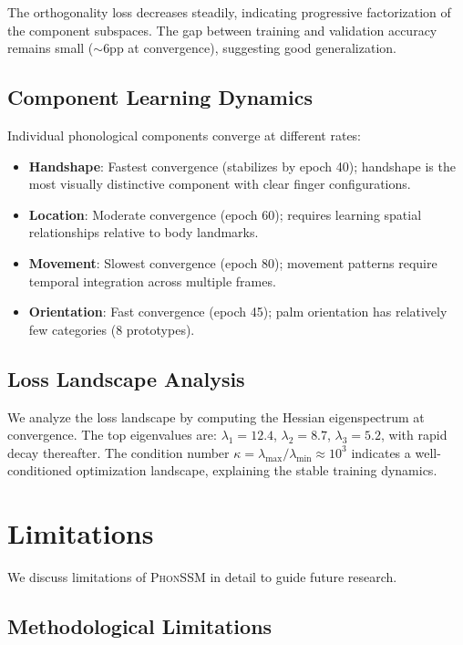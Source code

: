 \documentclass[sigconf,nonacm,anonymous]{acmart}
\theoremstyle{definition}
\theoremstyle{remark}
\newcommand{\phonssm}{\textsc{PhonSSM}}
\begin{document}
The orthogonality loss decreases steadily, indicating progressive factorization of the component subspaces. The gap between training and validation accuracy remains small ($\sim$6pp at convergence), suggesting good generalization.

\subsection{Component Learning Dynamics}

Individual phonological components converge at different rates:

\begin{itemize}[nosep,topsep=3pt,leftmargin=*]
\item \textbf{Handshape}: Fastest convergence (stabilizes by epoch 40); handshape is the most visually distinctive component with clear finger configurations.
\item \textbf{Location}: Moderate convergence (epoch 60); requires learning spatial relationships relative to body landmarks.
\item \textbf{Movement}: Slowest convergence (epoch 80); movement patterns require temporal integration across multiple frames.
\item \textbf{Orientation}: Fast convergence (epoch 45); palm orientation has relatively few categories (8 prototypes).
\end{itemize}

\subsection{Loss Landscape Analysis}

We analyze the loss landscape by computing the Hessian eigenspectrum at convergence. The top eigenvalues are: $\lambda_1 = 12.4$, $\lambda_2 = 8.7$, $\lambda_3 = 5.2$, with rapid decay thereafter. The condition number $\kappa = \lambda_{\max}/\lambda_{\min} \approx 10^3$ indicates a well-conditioned optimization landscape, explaining the stable training dynamics.

\section{Limitations}
\label{app:limitations}

We discuss limitations of \phonssm{} in detail to guide future research.

\subsection{Methodological Limitations}
\end{document}
